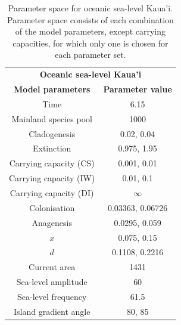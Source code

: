 \begin{table}[ht]
    \centering
    \caption{Parameter space for oceanic sea-level Kaua'i. Parameter space consists of each combination of the model parameters, except carrying capacities, for which only one is chosen for each parameter set.}
    \begin{tabular}{ c | c }
        \multicolumn{2}{c}{\textbf{Oceanic sea-level Kaua'i}} \\
        \textbf{Model parameters} & \textbf{Parameter value} \\ 
        \hline
        \hline
        Time & 6.15 \\
        \hline
        Mainland species pool & 1000 \\
        \hline
        Cladogenesis & 0.02, 0.04 \\
        \hline
        Extinction & 0.975, 1.95 \\
        \hline
        Carrying capacity (CS) & 0.001, 0.01 \\
        \hline
        Carrying capacity (IW) & 0.01, 0.1 \\
        \hline
        Carrying capacity (DI) & $\infty$ \\
        \hline
        Colonisation & 0.03363, 0.06726 \\
        \hline
        Anagenesis & 0.0295, 0.059 \\
        \hline
        $x$ & 0.075, 0.15 \\
        \hline
        $d$ & 0.1108, 0.2216 \\
        \hline
        Current area & 1431 \\
        \hline
        Sea-level amplitude & 60 \\
        \hline
        Sea-level frequency & 61.5 \\
        \hline
        Island gradient angle & 80, 85 \\
    \end{tabular}
    \label{tab:oceanic_sea_level_old}
\end{table}

